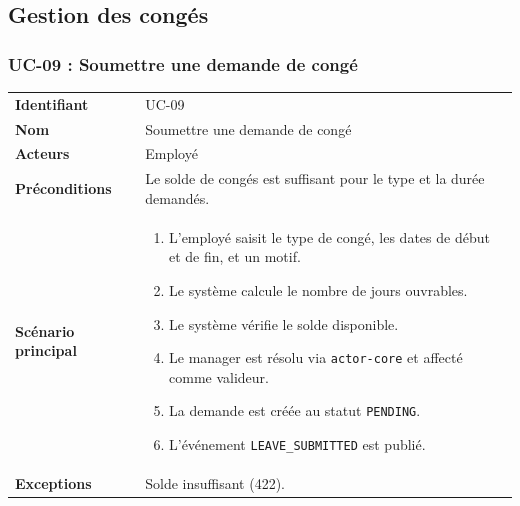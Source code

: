 \documentclass[a4paper,12pt,openany]{book}
\begin{document}

    \subsection{Gestion des congés}

    \subsubsection*{UC-09 : Soumettre une demande de congé}
    \begin{table}[H]
        \centering
        \begin{tabularx}{\textwidth}{lX}
    \toprule
    \textbf{Identifiant} & UC-09 \\
    \textbf{Nom}         & Soumettre une demande de congé \\
    \textbf{Acteurs}     & Employé \\
    \textbf{Préconditions} & Le solde de congés est suffisant pour le type et la durée demandés. \\
    \midrule
    \textbf{Scénario principal} &
    \begin{enumerate}[nosep]
      \item L'employé saisit le type de congé, les dates de début et de fin, et un motif.
      \item Le système calcule le nombre de jours ouvrables.
      \item Le système vérifie le solde disponible.
      \item Le manager est résolu via \texttt{actor-core} et affecté comme valideur.
      \item La demande est créée au statut \texttt{PENDING}.
      \item L'événement \texttt{LEAVE\_SUBMITTED} est publié.
    \end{enumerate} \\
    \textbf{Exceptions} & Solde insuffisant (422). \\
    \bottomrule
        \end{tabularx}
    \end{table}
\end{document}
